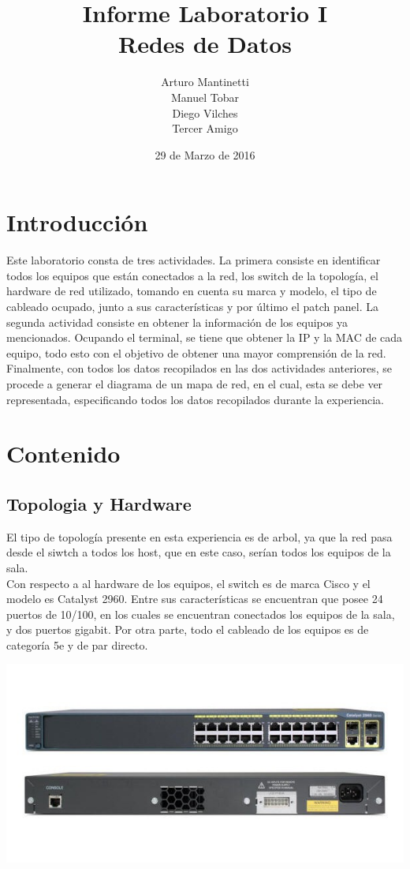 \documentclass[spanish]{udpreport}
\title{Informe Laboratorio I \\ Redes de Datos}
\author{Arturo Mantinetti \\ Manuel Tobar \\ Diego Vilches \\ Tercer Amigo}
\date{29 de Marzo de 2016}
\begin{document}
\maketitle

\tableofcontents

\chapter{Introducción}

Este laboratorio consta de tres actividades. La primera consiste en identificar todos los equipos que están conectados a la red, los switch de la topología, el hardware de red utilizado, tomando en cuenta su marca y modelo, el tipo de cableado ocupado, junto a sus características y por último el patch panel. La segunda actividad consiste en obtener la información de los equipos ya mencionados. Ocupando el terminal, se tiene que obtener la IP y la MAC de cada equipo, todo esto con el objetivo de obtener una mayor comprensión de la red. Finalmente, con todos los datos recopilados en las dos actividades anteriores, se procede a generar el diagrama de un mapa de red, en el cual, esta se debe ver representada,  especificando todos los datos recopilados durante la experiencia.


\chapter{Contenido}

\section{Topologia y Hardware}
El tipo de topología presente en esta experiencia es de arbol, ya que la red pasa desde el siwtch a todos los host, que en este caso, serían todos los equipos de la sala.
\\
 
\setlength{\parindent}{0.5cm} Con respecto a al hardware de los equipos, el switch es de marca Cisco y el modelo es Catalyst 2960. Entre sus características se encuentran que posee 24 puertos de 10/100, en los cuales se encuentran conectados los equipos de la sala, y dos puertos gigabit. Por otra parte, todo el cableado de los equipos es de categoría 5e y de par directo.
\begin{center}
	\includegraphics[scale=.37]{images/switch.png}
\end{center}
  
\end{document}
